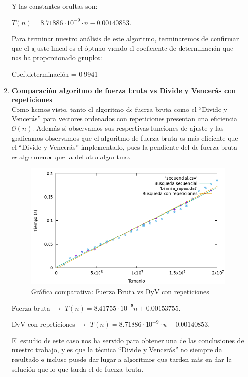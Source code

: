\documentclass[10pt,a4paper]{article}
\begin{document}
\begin{enumerate}
Y las constantes ocultas son:

\( T(n) = 8.71886 \cdot 10^{-9} \cdot n -0.00140853 \).

Para terminar nuestro análisis de este algoritmo, terminaremos de confirmar que el ajuste lineal es el óptimo viendo el coeficiente de determinación que nos ha proporcionado gnuplot:

Coef.determinación = 0.9941

\item \textbf{Comparación algoritmo de fuerza bruta vs Divide y Vencerás con repeticiones}\\

Como hemos visto, tanto el algoritmo de fuerza bruta como el ``Divide y Vencerás'' para vectores ordenados con repeticiones presentan una eficiencia $\mathcal{O}(n)$. Además si observamos sus respectivas funciones de ajuste y las graficamos observamos que el algoritmo de fuerza bruta es más eficiente que el ``Divide y Vencerás'' implementado, pues la pendiente del de fuerza bruta es algo menor que la del otro algoritmo:

\begin{figure}[h!]
	\centering
	\includegraphics[scale=0.55]{./Images/Grafica_secvsrep.png}
	\caption{Gráfica comparativa: Fuerza Bruta vs DyV con repeticiones}
\end{figure}


Fuerza bruta $\longrightarrow$ \( T(n) = 8.41755 \cdot 10^{-9} n + 0.00153755\).

DyV con repeticiones $\longrightarrow$ \( T(n) = 8.71886 \cdot 10^{-9} \cdot n -0.00140853 \).

El estudio de este caso nos ha servido para obtener una de las conclusiones de nuestro trabajo, y es que la técnica ``Divide y Vencerás'' no siempre da resultado e incluso puede dar lugar a algoritmos que tarden más en dar la solución que lo que tarda el de fuerza bruta.

\end{enumerate}
\end{document}
